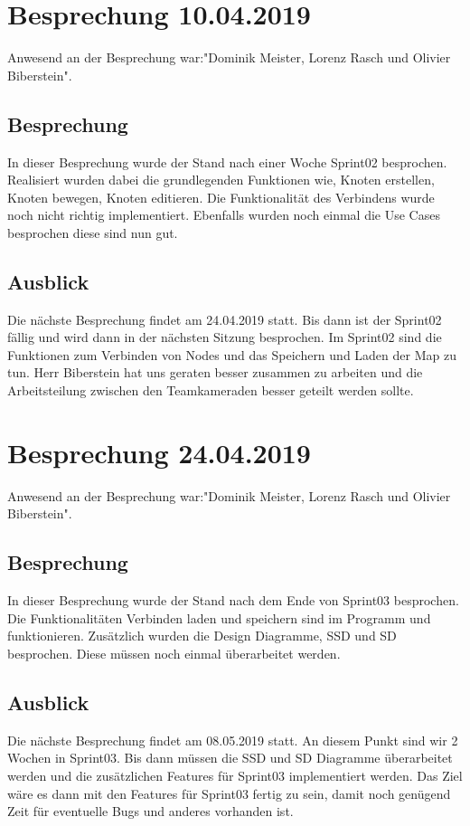\documentclass[a4paper,parskip]{scrartcl}
\begin{document}
\section{Besprechung 10.04.2019}
Anwesend an der Besprechung war:"Dominik Meister, Lorenz Rasch und Olivier Biberstein". 
\subsection{Besprechung}
In dieser Besprechung wurde der Stand nach einer Woche Sprint02 besprochen. Realisiert wurden dabei die 
grundlegenden Funktionen wie, Knoten erstellen, Knoten bewegen, Knoten editieren. Die Funktionalität des Verbindens wurde noch nicht richtig implementiert. Ebenfalls wurden noch einmal die Use Cases besprochen diese sind nun gut. 
\subsection{Ausblick}
Die nächste Besprechung findet am 24.04.2019 statt. Bis dann ist der Sprint02 fällig und wird dann in der nächsten Sitzung besprochen. Im Sprint02 sind die Funktionen zum Verbinden von Nodes und das Speichern und
Laden der Map zu tun. Herr Biberstein hat uns geraten besser zusammen zu arbeiten und die Arbeitsteilung
zwischen den Teamkameraden besser geteilt werden sollte.

\section{Besprechung 24.04.2019}
Anwesend an der Besprechung war:"Dominik Meister, Lorenz Rasch und Olivier Biberstein". 
\subsection{Besprechung}
In dieser Besprechung wurde der Stand nach dem Ende von Sprint03 besprochen. Die Funktionalitäten Verbinden laden und speichern sind im Programm und funktionieren. Zusätzlich wurden die Design Diagramme, SSD und SD besprochen. Diese müssen noch einmal überarbeitet werden.
\subsection{Ausblick}
Die nächste Besprechung findet am 08.05.2019 statt. An diesem Punkt sind wir 2 Wochen in Sprint03. Bis dann müssen die SSD und SD Diagramme überarbeitet werden und die zusätzlichen Features für Sprint03 implementiert werden. Das Ziel wäre es dann mit den Features für Sprint03 fertig zu sein, damit noch
genügend Zeit für eventuelle Bugs und anderes vorhanden ist.
\end{document}
